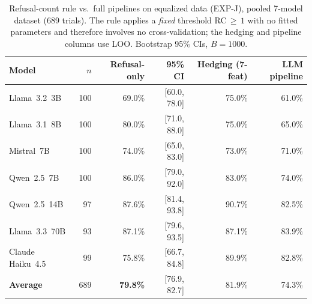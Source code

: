 \begin{table}[h]
\centering
\caption{Refusal-count rule vs.\ full pipelines on equalized data (EXP-J), pooled 7-model dataset (689 trials). The rule applies a \emph{fixed} threshold RC$\,\geq\,1$ with no fitted parameters and therefore involves no cross-validation; the hedging and pipeline columns use LOO. Bootstrap 95\% CIs, $B=1000$.}
\label{tab:refusal_only}
\begin{small}
\begin{tabular}{lrrrrr}
\toprule
\textbf{Model} & \textbf{$n$} & \textbf{Refusal-only} & \textbf{95\% CI} & \textbf{Hedging (7-feat)} & \textbf{LLM pipeline} \\
\midrule
Llama~3.2~3B     & 100 & 69.0\% & [60.0, 78.0] & 75.0\% & 61.0\% \\
Llama~3.1~8B     & 100 & 80.0\% & [71.0, 88.0] & 75.0\% & 65.0\% \\
Mistral~7B       & 100 & 74.0\% & [65.0, 83.0] & 73.0\% & 71.0\% \\
Qwen~2.5~7B      & 100 & 86.0\% & [79.0, 92.0] & 83.0\% & 74.0\% \\
Qwen~2.5~14B     &  97 & 87.6\% & [81.4, 93.8] & 90.7\% & 82.5\% \\
Llama~3.3~70B    &  93 & 87.1\% & [79.6, 93.5] & 87.1\% & 83.9\% \\
Claude Haiku~4.5 &  99 & 75.8\% & [66.7, 84.8] & 89.9\% & 82.8\% \\
\midrule
\textbf{Average}  & 689 & \textbf{79.8\%} & [76.9, 82.7] & 81.9\% & 74.3\% \\
\bottomrule
\end{tabular}
\end{small}
\end{table}

